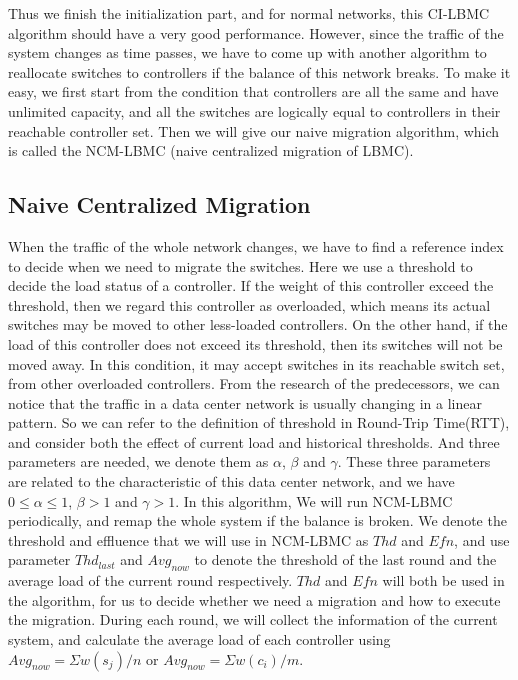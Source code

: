 Thus we finish the initialization part, and for normal networks, this CI-LBMC algorithm should have a very good performance. However, since the traffic of the system changes as time passes, we have to come up with another algorithm to reallocate switches to controllers if the balance of this network breaks. To make it easy, we first start from the condition that controllers are all the same and have unlimited capacity, and all the switches are logically equal to controllers in their reachable controller set. Then we will give our naive migration algorithm, which is called the NCM-LBMC (naive centralized migration of LBMC).

\subsection{Naive Centralized Migration}
When the traffic of the whole network changes, we have to find a reference index to decide when we need to migrate the switches. Here we use a threshold to decide the load status of a controller. If the weight of this controller exceed the threshold, then we regard this controller as overloaded, which means its actual switches may be moved to other less-loaded controllers. On the other hand, if the load of this controller does not exceed its threshold, then its switches will not be moved away. In this condition, it may accept switches in its reachable switch set, from other overloaded controllers. From the research of the predecessors, we can notice that the traffic in a data center network is usually changing in a linear pattern. So we can refer to the definition of threshold in Round-Trip Time(RTT), and consider both the effect of current load and historical thresholds. And three parameters are needed, we denote them as $\alpha$, $\beta$ and $\gamma$. These three parameters are related to the characteristic of this data center network, and we have $0\le\alpha\le1$, $\beta > 1$ and $\gamma > 1$. In this algorithm, We will run NCM-LBMC periodically, and remap the whole system if the balance is broken. We denote the threshold and effluence that we will use in NCM-LBMC as $Thd$ and $Efn$, and use parameter $Thd_{last}$ and $Avg_{now}$ to denote the threshold of the last round and the average load of the current round respectively. $Thd$ and $Efn$ will both be used in the algorithm, for us to decide whether we need a migration and how to execute the migration. During each round, we will collect the information of the current system, and calculate the average load of each controller using $Avg_{now}=\Sigma w(s_j)/n$ or $Avg_{now}=\Sigma w(c_i)/m$.

